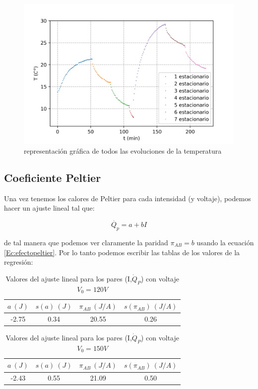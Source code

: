 \documentclass[12pt,a4paper]{article}
\begin{document}
\begin{figure}[h!] 	 \centering 
\includegraphics[scale=1.0]{plot-peltier-todos.png} 
\caption{representación gráfica de todos las evoluciones de la temperatura} 
\end{figure} 


\newpage

\subsection{Coeficiente Peltier}

Una vez tenemos los calores de Peltier para cada intensidad (y voltaje), podemos hacer un ajuste lineal tal que:

\begin{equation}
\dot{Q_p} = a + bI
\end{equation}

de tal manera que podemos ver claramente la paridad $\pi_{AB} = b$ usando la ecuación \ref{Ec:efectopeltier}. Por lo tanto podemos escribir las tablas de los valores de la regresión:

\begin{table}[h!] 	 \centering 
\begin{tabular}{|c|c|c|c|} 
\hline 
$a \ (J)$ & $s(a) \ (J)$ & $\pi_{AB} \ (J/A)$ & $s(\pi_{AB}) \ (J/A)$  \\ \hline 
-2.75  & 0.34 &  20.55 & 0.26 \\ 
\hline
\end{tabular} 
\caption{Valores del ajuste lineal para los pares (I,$\dot{Q}_P$) con voltaje $V_0=120V$} 
\label{tab:peltier1} 
\end{table} 

\begin{table}[h!] 	 \centering 
\begin{tabular}{|c|c|c|c|} 
\hline 
$a \ (J)$ & $s(a) \ (J)$ & $\pi_{AB} \ (J/A)$ & $s(\pi_{AB}) \ (J/A)$  \\ \hline 
-2.43  & 0.55 &  21.09 & 0.50 \\ 
\hline
\end{tabular} 
\caption{Valores del ajuste lineal para los pares (I,$\dot{Q}_P$) con voltaje $V_0=150V$} 
\label{tab:peltier2} 
\end{table} 
\end{document}
